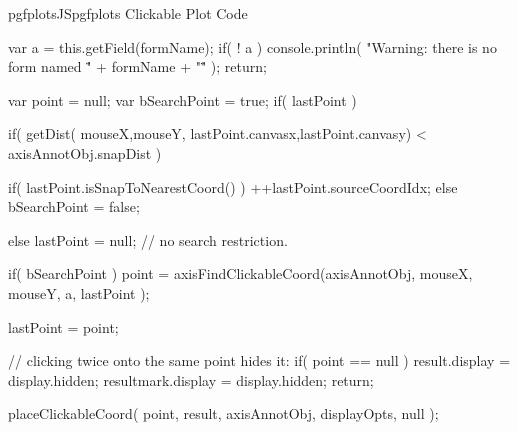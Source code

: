 {{\begin{insDLJS}[processAnnotatedPlot]{pgfplotsJS}{pgfplots Clickable Plot Code}
{	var a = this.getField(formName);
	if( ! a ) {
		console.println( "Warning: there is no form named \"" + formName + "\"" );
		return;
	}

	var point = null;
	var bSearchPoint = true;
	if( lastPoint ) {
		if( getDist( mouseX,mouseY,  lastPoint.canvasx,lastPoint.canvasy) < axisAnnotObj.snapDist ) {
			if( lastPoint.isSnapToNearestCoord() )
				++lastPoint.sourceCoordIdx;
			else
				bSearchPoint = false;

		} else
			lastPoint = null; // no search restriction.
	}
	if( bSearchPoint )
		point = axisFindClickableCoord(axisAnnotObj, mouseX, mouseY, a, lastPoint ); 

	lastPoint = point;

	// clicking twice onto the same point hides it:
	if( point == null ) {
		result.display = display.hidden;
		resultmark.display = display.hidden;
		return;
	}

	placeClickableCoord( 
		point,
		result, axisAnnotObj, displayOpts, null );
}

\end{insDLJS}

%
%
\def\pgfplots@clickable@xypat@error{\pgfplots@error{Sorry, \string\pgfplotsset{annot/xy pattern/.initial=...} can only be assigned *before* \string\usepgfplotslibrary{clickable}}}%

\def\pgfplots@clickable@beginaxis{%
	\pgfplotsapplistXglobalnewempty\pgfplots@clickable@collectedplots
	\gdef\pgfplots@clickable@collectedplots@isempty{1}%
}%

}}
